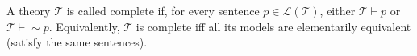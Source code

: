 A theory $\mathcal{T}$ is called complete if, for every sentence $p \in \mathcal{L}(\mathcal{T})$, either $\mathcal{T} \vdash p$ or $\mathcal{T} \vdash \sim p$. Equivalently, $\mathcal{T}$ is complete iff all its models are elementarily equivalent (satisfy the same sentences).
